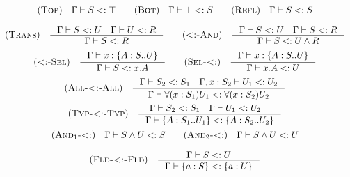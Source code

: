 \[\begin{array}{c}
    \RULE{Top} \quad \SJT{\Gamma}{S}{\top} \qquad

    \RULE{Bot} \quad \SJT{\Gamma}{\bot}{S} \qquad

    \RULE{Refl} \quad \SJT{\Gamma}{S}{S} \\[4mm]

    \RULE{Trans} \quad \inference{
        \SJT{\Gamma}{S}{U} \quad
        \SJT{\Gamma}{U}{R}
    }{
        \SJT{\Gamma}{S}{R}
    } \qquad

    \RULE{<:-And} \quad \inference{
        \SJT{\Gamma}{S}{U} \quad
        \SJT{\Gamma}{S}{R}
    }{
        \SJT{\Gamma}{S}{\AGG{U}{R}}
    } \\[4mm]

    \RULE{<:-Sel} \quad \inference{
        \TJT{\Gamma}{x}{\TDEC{A}{S}{U}}
    }{
        \SJT{\Gamma}{S}{x.A}
    } \qquad

    \RULE{Sel-<:} \quad \inference{
        \TJT{\Gamma}{x}{\TDEC{A}{S}{U}}
    }{
        \SJT{\Gamma}{x.A}{U}
    } \\[4mm]

    \RULE{All-<:-All} \quad \inference{
        \SJT{\Gamma}{S_2}{S_1} \quad
        \SJT{\Gamma, x: S_2}{U_1}{U_2}
    }{
        \SJT{\Gamma}{\DFUN{x}{S_1}{U_1}}{\DFUN{x}{S_2}{U_2}}
    } \\[4mm]

    \RULE{Typ-<:-Typ} \quad \inference{
        \SJT{\Gamma}{S_2}{S_1} \quad
        \SJT{\Gamma}{U_1}{U_2} \quad
    }{
        \SJT{\Gamma}{\TDEC{A}{S_1}{U_1}}{\TDEC{A}{S_2}{U_2}}
    } \\[4mm]

    \RULE{And$_1$-<:} \quad \SJT{\Gamma}{\AGG{S}{U}}{S} \qquad

    \RULE{And$_2$-<:} \quad \SJT{\Gamma}{\AGG{S}{U}}{U} \\[4mm]

    \RULE{Fld-<:-Fld} \quad \inference{
        \SJT{\Gamma}{S}{U}
    }{
        \SJT{\Gamma}{\FDEC{a}{S}}{\FDEC{a}{U}}
    }
\end{array}\]
